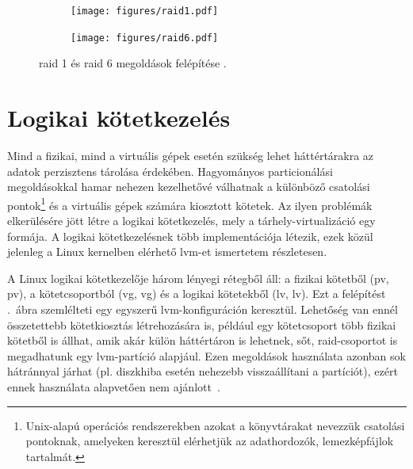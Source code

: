 \begin{figure}[!ht]
	\centering
	\begin{subfigure}{0.3\textwidth}
		\centering
		\texttt{[image: figures/raid1.pdf]}
	\end{subfigure}
	\hspace{0.05\textwidth}
	\begin{subfigure}{0.6\textwidth}
		\centering
		\texttt{[image: figures/raid6.pdf]}
	\end{subfigure}
	\caption{\acrshort{raid} 1 és \acrshort{raid} 6 megoldások felépítése \cite{WikiRaidLevels}.}
	\label{fig:raid}
\end{figure}


\section{Logikai kötetkezelés}
\label{sect:lvm}
Mind a fizikai, mind a virtuális gépek esetén szükség lehet háttértárakra az adatok perzisztens tárolása érdekében. Hagyományos particionálási megoldásokkal hamar nehezen kezelhetővé válhatnak a különböző csatolási pontok\footnote{Unix-alapú operációs rendszerekben azokat a könyvtárakat nevezzük csatolási pontoknak, amelyeken keresztül elérhetjük az adathordozók, lemezképfájlok tartalmát.} és a virtuális gépek számára kiosztott kötetek. Az ilyen problémák elkerülésére jött létre a logikai kötetkezelés, mely a tárhely-virtualizáció egy formája. A logikai kötetkezelésnek több implementációja létezik, ezek közül jelenleg a Linux kernelben elérhető \gls{lvm}-et ismertetem részletesen.

A Linux logikai kötetkezelője három lényegi rétegből áll: a fizikai kötetből (\acrlong{pv}, \acrshort{pv}), a kötetcsoportból (\acrlong{vg}, \acrshort{vg}) és a logikai kötetekből (\acrlong{lv}, \acrshort{lv}). Ezt a felépítést .~ábra szemlélteti egy egyszerű \gls{lvm}-konfiguráción keresztül.
Lehetőség van ennél összetettebb kötetkiosztás létrehozására is, például egy kötetcsoport több fizikai kötetből is állhat, amik akár külön háttértáron is lehetnek, sőt, \acrshort{raid}-csoportot is megadhatunk egy \gls{lvm}-partíció alapjául. Ezen megoldások használata azonban sok hátránnyal járhat (pl. diszkhiba esetén nehezebb visszaállítani a partíciót), ezért ennek használata alapvetően nem ajánlott~\cite{RHLVM}.

